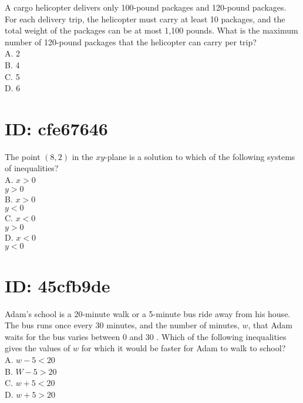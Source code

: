 

A cargo helicopter delivers only 100-pound packages and 120-pound packages. For each delivery trip, the helicopter must carry at least 10 packages, and the total weight of the packages can be at most 1,100 pounds. What is the maximum number of 120-pound packages that the helicopter can carry per trip?\\
A. 2\\
B. 4\\
C. 5\\
D. 6

\section*{ID: cfe67646}
The point $(8,2)$ in the $x y$-plane is a solution to which of the following systems of inequalities?\\
A. $x>0$\\
$y>0$\\
B. $x>0$\\
$y<0$\\
C. $x<0$\\
$y>0$\\
D. $x<0$\\
$y<0$

\section*{ID: 45cfb9de}
Adam's school is a 20-minute walk or a 5-minute bus ride away from his house. The bus runs once every 30 minutes, and the number of minutes, $w$, that Adam waits for the bus varies between 0 and 30 . Which of the following inequalities gives the values of $w$ for which it would be faster for Adam to walk to school?\\
A. $w-5<20$\\
B. $W-5>20$\\
C. $w+5<20$\\
D. $w+5>20$

